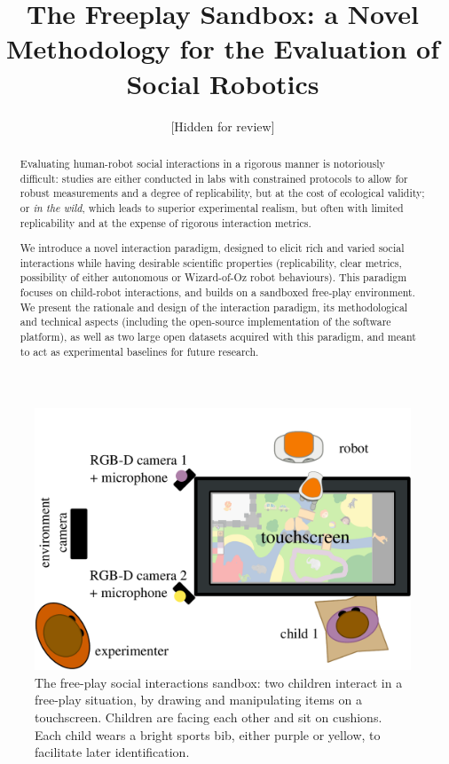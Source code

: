 \documentclass[sigconf]{acmart}
\title{The Freeplay Sandbox: a Novel Methodology for the Evaluation of Social Robotics}
\author{[Hidden for review]}
\begin{document}
\begin{abstract}

Evaluating human-robot social interactions in a rigorous manner is notoriously
difficult: studies are either conducted in labs
with constrained protocols to allow for robust measurements and a degree of
replicability, but at the cost of ecological validity; or \emph{in the wild},
which leads to superior experimental realism, but often with limited
replicability and at the expense of rigorous interaction metrics.

We introduce a novel interaction paradigm, designed to elicit rich
and varied social interactions while having desirable scientific properties
(replicability, clear metrics, possibility of either autonomous or Wizard-of-Oz
robot behaviours). This paradigm focuses on child-robot interactions, and
builds on a sandboxed free-play environment. We present the
rationale and design of the interaction paradigm, its 
methodological and technical aspects (including the open-source
implementation of the software platform), as well as two large open datasets
acquired with this paradigm, and meant to act as experimental baselines for
future research.

\end{abstract}

\maketitle

\begin{figure}
    \centering
    \includegraphics[width=0.9\columnwidth]{setup_top}
    \caption{The free-play social interactions sandbox: two children interact in
    a free-play situation, by drawing and manipulating items on a touchscreen.
    Children are facing each other and sit on cushions. Each child wears a
    bright sports bib, either purple or yellow, to facilitate later
    identification.}

    \label{fig|freeplay}
\end{figure}
\end{document}

